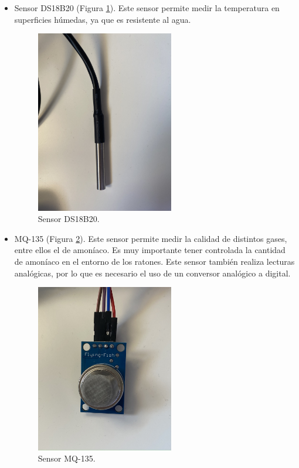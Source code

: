 \begin{itemize}
\item{Sensor DS18B20 (Figura \ref{fig:ds}).} Este sensor permite medir la temperatura en superficies húmedas, ya que es resistente al agua.
\begin{figure} [h!]
  \begin{center}
    \includegraphics[width=6cm]{figs/ds}
  \end{center}
  \caption{Sensor DS18B20.}
  \label{fig:ds}
\end{figure}

\item{MQ-135 (Figura \ref{fig:mq}).} Este sensor permite medir la calidad de distintos gases, entre ellos el de amoníaco. Es muy importante tener controlada la cantidad de amoníaco en el entorno de los ratones. Este sensor también realiza lecturas analógicas, por lo que es necesario el uso de un conversor analógico a digital.
\begin{figure} [h!]
  \begin{center}
    \includegraphics[width=6cm]{figs/mq}
  \end{center}
  \caption{Sensor MQ-135.}
  \label{fig:mq}
\end{figure}


\end{itemize}
